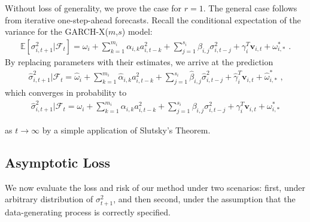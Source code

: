 \documentclass[11pt,3p,review,authoryear]{elsarticle}
\newcommand{\x}{\textbf{v}}
\def\E{\mathbb{E}} %
\theoremstyle{definition}
\newenvironment{proof-of-proposition}[1][{}]{\noindent{\bf
    Proof of Proposition {#1}}
  \hspace*{.5em}}{\qed\bigskip\\}
\begin{document}
\begin{proof-of-proposition}
Without loss of generality, we prove the case for $r = 1$.  The general case follows from iterative one-step-ahead forecasts.  Recall the conditional expectation of the variance for the GARCH-X($m$,$s$) model:
\begin{align*}
\E[\sigma^{2}_{i,t+1}|\mathcal{F}_{t}] = \omega_{i} +  \sum^{m_{i}}_{k=1}\alpha_{i,k}a^{2}_{i,t-k} + \sum_{j=1}^{s_{i}}\beta_{i,j}\sigma_{i,t-j}^{2} + \gamma_{i}^{T} \x_{i,t} + \omega^{*}_{i,*} \text{ .}
\end{align*}
By replacing parameters with their estimates, we arrive at the prediction 
\begin{align*}
\hat\sigma^{2}_{i,t+1}|\mathcal{F}_{t} = \hat\omega_{i} + \sum^{m_{i}}_{k=1}\hat\alpha_{i,k}a^{2}_{i,t-k} + \sum_{j=1}^{s_{i}}\hat\beta_{i,j}\hat\sigma_{i,t-j}^{2} + \hat\gamma_{i}^{T} \x_{i,t} + \hat\omega^{*}_{i,*}\text { ,}
\end{align*}
which converges in probability to 
\begin{align*}
  \hat\sigma^{2}_{i,t+1}|\mathcal{F}_{t} = \omega_{i} + \sum^{m_{i}}_{k=1}\alpha_{i,k}a^{2}_{i,t-k} + \sum_{j=1}^{s_{i}}\beta_{i,j}\sigma_{i,t-j}^{2} + \gamma_{i}^{T} \x_{i,t} + \omega^{*}_{i,*}
  \end{align*}

as $t\rightarrow\infty$ by a simple application of Slutsky's Theorem.
\end{proof-of-proposition}

\subsection{Asymptotic Loss}

We now evaluate the loss and risk of our method under two scenarios: first, under arbitrary distribution of $\sigma^{2}_{t+1}$, and then second, under the assumption that the data-generating process is correctly specified.
\end{document}
